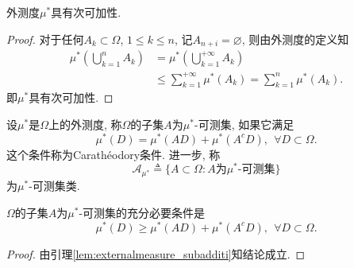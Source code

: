 \begin{lemma}
	外测度$\mu^*$具有次可加性.\label{lem:externalmeasure_subadditi}
\end{lemma}
\begin{proof}
	对于任何$A_k\subset\Omega$, $1\leqslant k\leqslant n$, 记$A_{n+i} = \varnothing$, 则由外测度的定义知
	\begin{align}
		\mu^*\left( \bigcup_{k=1}^nA_k \right) &= \mu^*\left( \bigcup_{k=1}^{+\infty}A_k \right)\nonumber\\
		&\leqslant \sum_{k=1}^{+\infty}\mu^*(A_k) = \sum_{k=1}^{n}\mu^*(A_k).
	\end{align}
	即$\mu^*$具有次可加性.
\end{proof}

\begin{definition}
	设$\mu^*$是$\Omega$上的外测度, 称$\Omega$的子集$A$为$\mu^*$-可测集, 如果它满足
	\begin{equation}\label{eq:1.20}
		\mu^*(D) = \mu^*(AD) + \mu^*(A^cD),~~\forall D\subset \Omega.
	\end{equation}
	这个条件称为Carathéodory条件. 进一步, 称\begin{equation}
		\mathscr{A}_{\mu^*} \triangleq \{ A\subset\Omega : A\text{为}\mu^*\text{-可测集} \}
	\end{equation}
	为$\mu^*$-可测集类.
\end{definition}

\begin{lemma}\label{lemma:1.2.2}
	$\Omega$的子集$A$为$\mu^*$-可测集的充分必要条件是
	\begin{equation}
		\mu^*(D)\geqslant \mu^*(AD) + \mu^*(A^cD),~~\forall D\subset\Omega.
	\end{equation}
\end{lemma}
\begin{proof}
	由引理\ref{lem:externalmeasure_subadditi}知结论成立.
\end{proof}


